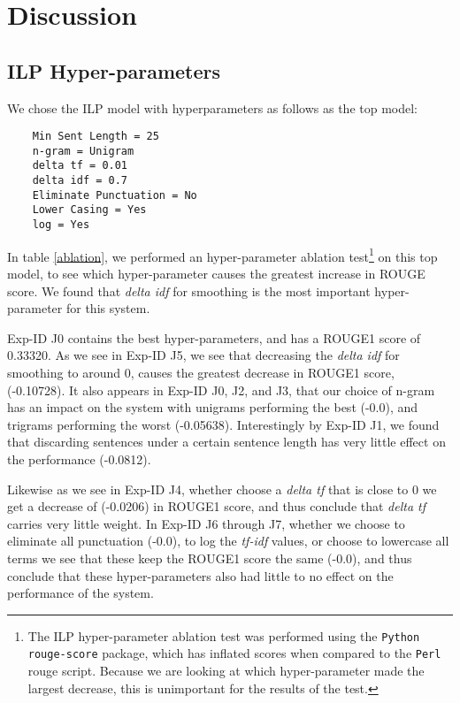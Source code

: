\section{Discussion}






\subsection{ILP Hyper-parameters}



We chose the ILP model with hyperparameters as follows as the top model:
\begin{verbatim}
    Min Sent Length = 25
    n-gram = Unigram
    delta tf = 0.01
    delta idf = 0.7
    Eliminate Punctuation = No
    Lower Casing = Yes
    log = Yes
\end{verbatim}

In table \ref{ablation}, we performed an hyper-parameter ablation test\footnote{The ILP hyper-parameter ablation test was performed using the \texttt{Python rouge-score} package, which has inflated scores when compared to the \texttt{Perl} rouge script. Because we are looking at which hyper-parameter made the largest decrease, this is unimportant for the results of the test.} on this top model, to see which hyper-parameter causes the greatest increase in ROUGE score. We found that \textit{delta idf} for smoothing is the most important hyper-parameter for this system. 

Exp-ID J0 contains the best hyper-parameters, and has a ROUGE1 score of 0.33320. As we see in Exp-ID J5, we see that decreasing the \textit{delta idf} for smoothing to around 0, causes the greatest decrease in ROUGE1 score, (-0.10728). It also appears in Exp-ID J0, J2, and J3, that our choice of n-gram has an impact on the system with unigrams performing the best (-0.0), and trigrams performing the worst (-0.05638). Interestingly by Exp-ID J1, we found that discarding sentences under a certain sentence length has very little effect on the performance (-0.0812).

Likewise as we see in Exp-ID J4, whether choose a \textit{delta tf} that is close to 0 we get a decrease of (-0.0206) in ROUGE1 score, and thus conclude that \textit{delta tf} carries very little weight. In Exp-ID J6 through J7, whether we choose to eliminate all punctuation (-0.0), to log the \textit{tf-idf} values, or choose to lowercase all terms we see that these keep the ROUGE1 score the same (-0.0), and thus conclude that these hyper-parameters also had little to no effect on the performance of the system.

